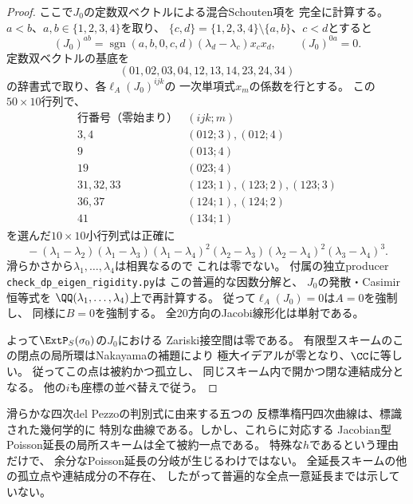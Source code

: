\begin{proof}
ここで$J_0$の定数双ベクトルによる混合Schouten項を
完全に計算する。$a<b$、$a,b\in\{1,2,3,4\}$を取り、
$\{c,d\}=\{1,2,3,4\}\setminus\{a,b\}$、$c<d$とすると
\[
 (J_0)^{ab}
  =\operatorname{sgn}(a,b,0,c,d)
       (\lambda_d-\lambda_c)x_cx_d,\qquad
 (J_0)^{0a}=0.
\]
定数双ベクトルの基底を
\[
 (01,02,03,04,12,13,14,23,24,34)
\]
の辞書式で取り、各$\ell_A(J_0)^{ijk}$の
一次単項式$x_m$の係数を行とする。
この$50\times10$行列で、
\[
\begin{array}{c|c}
\text{行番号（零始まり）}&(ijk;m)\\\hline
3,4&(012;3),(012;4)\\
9&(013;4)\\
19&(023;4)\\
31,32,33&(123;1),(123;2),(123;3)\\
36,37&(124;1),(124;2)\\
41&(134;1)
\end{array}
\]
を選んだ$10\times10$小行列式は正確に
\begin{equation}\label{eq:dp-eigen-nonzero-minor}
\boxed{\quad
-(\lambda_1-\lambda_2)(\lambda_1-\lambda_3)
(\lambda_1-\lambda_4)^2(\lambda_2-\lambda_3)
(\lambda_2-\lambda_4)^2(\lambda_3-\lambda_4)^3.
\quad}
\end{equation}
滑らかさから$\lambda_1,\ldots,\lambda_4$は相異なるので
これは零でない。
付属の独立producer
\texttt{check\_dp\_eigen\_rigidity.py}は
この普遍的な因数分解と、
$J_0$の発散・Casimir恒等式を
$\QQ(\lambda_1,\ldots,\lambda_4)$上で再計算する。
従って$\ell_A(J_0)=0$は$A=0$を強制し、
同様に$B=0$を強制する。
全20方向のJacobi線形化は単射である。

よって$\ExtP_S(\sigma_0)$の$J_0$における
Zariski接空間は零である。
有限型スキームのこの閉点の局所環はNakayamaの補題により
極大イデアルが零となり、$\CC$に等しい。
従ってこの点は被約かつ孤立し、
同じスキーム内で開かつ閉な連結成分となる。
他の$i$も座標の並べ替えで従う。
\end{proof}

\begin{remark}[特殊曲線を持つことと例外的延長は異なる]
滑らかな四次del Pezzoの判別式に由来する五つの
反標準楕円四次曲線は、標識された幾何学的に
特別な曲線である。しかし、これらに対応する
Jacobian型Poisson延長の局所スキームは全て被約一点である。
特殊な$h$であるという理由だけで、
余分なPoisson延長の分岐が生じるわけではない。
全延長スキームの他の孤立点や連結成分の不存在、
したがって普遍的な全点一意延長までは示していない。
\end{remark}
